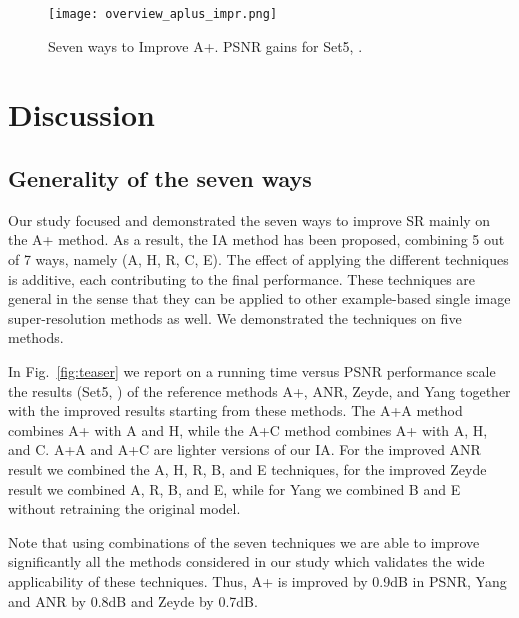 \documentclass[10pt,twocolumn,letterpaper]{article}
\begin{document}
\begin{figure}
\centering
\texttt{[image: overview\_aplus\_impr.png]}
\caption{Seven ways to Improve A+. PSNR gains for Set5, .}
\label{fig:seven}
\vspace{-0.25cm}
\end{figure}

\section{Discussion}
\label{sec:discussion}

\subsection{Generality of the seven ways}
\label{ssc:generality}
Our study focused and demonstrated the seven ways to improve SR mainly on the A+ method.
As a result, the IA method has been proposed, combining 5 out of 7 ways, namely (A, H, R, C, E).
The effect of applying the different techniques is additive, each contributing to the final performance.
These techniques are general in the sense that they can be applied to other example-based single image super-resolution methods as well. We demonstrated the techniques on five methods.

In Fig.~\ref{fig:teaser} we report on a running time versus PSNR performance scale the results (Set5, ) of the reference methods A+, ANR, Zeyde, and Yang together with the improved results starting from these methods.
The A+A method combines A+ with A and H, while the A+C method combines A+ with A, H, and C. A+A and A+C are lighter versions of our IA.
For the improved ANR result we combined the A, H, R, B, and E techniques, for the improved Zeyde result we combined A, R, B, and E, while for Yang we combined B and E without retraining the original model.

Note that using combinations of the seven techniques we are able to improve significantly all the methods considered in our study which validates the wide applicability of these techniques. Thus, A+ is improved by 0.9dB in PSNR, Yang and ANR by 0.8dB and Zeyde by 0.7dB.
\end{document}
